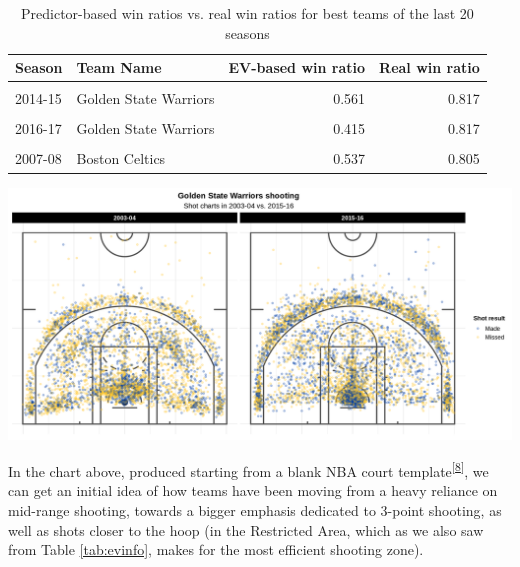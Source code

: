 \documentclass[
  12pt,
  a4paper,
]{article}
\let\origfigure\figure
\let\endorigfigure\endfigure
\renewenvironment{figure}[1][2] {
    \expandafter\origfigure\expandafter[H]
} {
    \endorigfigure
}
\begin{document}
\begin{table}[H]

\caption{\label{tab:teamspct}Predictor-based win ratios
                 vs. real win ratios for best
                 teams of the last 20 seasons}
\centering
\begin{tabular}[t]{llrr}
\toprule
Season & Team Name & EV-based win ratio & Real win ratio\\
\midrule
\cellcolor{gray!30}{2015-16} & \cellcolor{gray!30}{Golden State Warriors} & \cellcolor{gray!30}{0.573} & \cellcolor{gray!30}{0.890}\\
2014-15 & Golden State Warriors & 0.561 & 0.817\\
\cellcolor{gray!30}{2015-16} & \cellcolor{gray!30}{San Antonio Spurs} & \cellcolor{gray!30}{0.439} & \cellcolor{gray!30}{0.817}\\
2016-17 & Golden State Warriors & 0.415 & 0.817\\
\cellcolor{gray!30}{2006-07} & \cellcolor{gray!30}{Dallas Mavericks} & \cellcolor{gray!30}{0.573} & \cellcolor{gray!30}{0.805}\\
2007-08 & Boston Celtics & 0.537 & 0.805\\
\bottomrule
\end{tabular}
\end{table}

\begin{figure}

{\centering \includegraphics[width=1\linewidth]{latex/plotspng/plot_3} 

}

\caption{Golden State Warriors shooting charts in 2003-04 and 2015-16}\label{fig:warriors}
\end{figure}

In the chart above, produced starting from a blank NBA court template\textsuperscript{{[}\protect\hyperlink{ref-BasketballCourtR}{8}{]}}, we can get an initial idea of how teams have been moving from a heavy reliance on mid-range shooting, towards a bigger emphasis dedicated to 3-point shooting, as well as shots closer to the hoop (in the Restricted Area, which as we also saw from Table \ref{tab:evinfo}, makes for the most efficient shooting zone).
\end{document}
